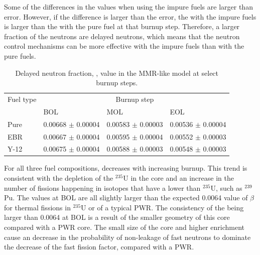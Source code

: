 Some of the differences in the \betaEff values when using the impure fuels are 
larger than error. However, if the difference is larger than the error, the \betaEff
with the impure fuels is larger than the \betaEff with the pure fuel at that burnup step. 
Therefore, a larger fraction of the neutrons are delayed neutrons, which means that 
the neutron control mechanisms can be more effective with the impure fuels than with 
the pure fuels. 

\begin{table}[h!]
        \centering
        \caption{Delayed neutron fraction, \betaEff,
        value in the \gls*{MMR}-like model at 
        select burnup steps.}
        \label{tab:mmr_betaeff}
        \begin{tabular}{l l l l}
                \hline 
                Fuel type & \multicolumn{3}{c}{Burnup step}\\
                & \gls*{BOL} & \gls*{MOL} & \gls*{EOL}\\
                \hline 
                Pure & 0.00668 $\pm$ 0.00004 & 0.00583 $\pm$ 0.00003 & 0.00536 $\pm$ 0.00004\\
                \gls*{EBR} & 0.00667 $\pm$ 0.00004 & 0.00595 $\pm$ 0.00004 & 0.00552 $\pm$ 0.00003\\
                Y-12 & 0.00675 $\pm$ 0.00004 &  0.00588 $\pm$ 0.00003 & 0.00548 $\pm$ 0.00003\\
                \hline 

        \end{tabular}
\end{table}

For all three 
fuel compositions, \betaEff decreases with increasing burnup. This trend
is consistent with the depletion of the $^{235}$U in the core and 
an increase in the number of fissions happening in isotopes
that have a lower \betaEff than $^{235}$U, such as $^{239}$Pu. 
The \betaEff values at \gls*{BOL} are all slightly larger 
than the expected 0.0064 value of $\beta$ for thermal fissions in $^{235}$U
or \betaEff of a typical \gls*{PWR}. The consistency of the 
\betaEff being
larger than 0.0064 at \gls*{BOL} 
is a result of the smaller geometry of this core compared with a 
\gls*{PWR} core.
The small size of the core and higher enrichment cause an 
decrease in the probability of non-leakage of fast neutrons to 
dominate the decrease of the fast fission factor, compared with a \gls*{PWR}. 

